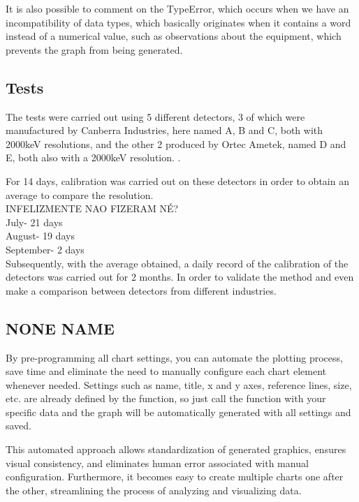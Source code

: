 \documentclass[fleqn,usenatbib]{rasti}
\begin{document}
It is also possible to comment on the TypeError, which occurs when we have an incompatibility of data types, which basically originates when it contains a word instead of a numerical value, such as observations about the equipment, which prevents the graph from being generated.

\subsection{Tests}
\label{sec:tests} 

The tests were carried out using 5 different detectors, 3 of which were manufactured by Canberra Industries, here named A, B and C, both with 2000keV resolutions, and the other 2 produced by Ortec Ametek, named D and E, both also with a 2000keV resolution. .

For 14 days, calibration was carried out on these detectors in order to obtain an average to compare the resolution.\\ 

INFELIZMENTE NAO FIZERAM NÉ? \\ 

July- 21 days\\ 
August- 19 days\\ 
September- 2 days\\ 


Subsequently, with the average obtained, a daily record of the calibration of the detectors was carried out for 2 months. In order to validate the method and even make a comparison between detectors from different industries.

\subsection{NONE NAME}
\label{sec:none} 

By pre-programming all chart settings, you can automate the plotting process, save time and eliminate the need to manually configure each chart element whenever needed. Settings such as name, title, x and y axes, reference lines, size, etc. are already defined by the function, so just call the function with your specific data and the graph will be automatically generated with all settings and saved.

This automated approach allows standardization of generated graphics, ensures visual consistency, and eliminates human error associated with manual configuration. Furthermore, it becomes easy to create multiple charts one after the other, streamlining the process of analyzing and visualizing data.
\end{document}
